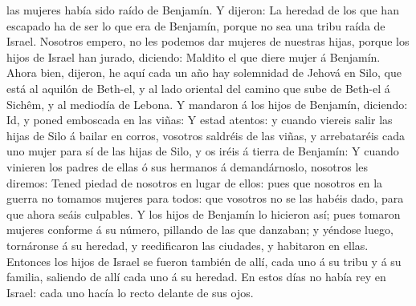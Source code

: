 las mujeres había sido raído de Benjamín.  Y dijeron: La
heredad de los que han escapado ha de ser lo que era de Benjamín, porque
no sea una tribu raída de Israel.  Nosotros empero, no les
podemos dar mujeres de nuestras hijas, porque los hijos de Israel han
jurado, diciendo: Maldito el que diere mujer á Benjamín. 
Ahora bien, dijeron, he aquí cada un año hay solemnidad de Jehová en
Silo, que está al aquilón de Beth-el, y al lado oriental del camino que
sube de Beth-el á Sichêm, y al mediodía de Lebona.  Y
mandaron á los hijos de Benjamín, diciendo: Id, y poned emboscada en las
viñas:  Y estad atentos: y cuando viereis salir las hijas
de Silo á bailar en corros, vosotros saldréis de las viñas, y
arrebataréis cada uno mujer para sí de las hijas de Silo, y os iréis á
tierra de Benjamín:  Y cuando vinieren los padres de ellas
ó sus hermanos á demandárnoslo, nosotros les diremos: Tened piedad de
nosotros en lugar de ellos: pues que nosotros en la guerra no tomamos
mujeres para todos: que vosotros no se las habéis dado, para que ahora
seáis culpables.  Y los hijos de Benjamín lo hicieron así;
pues tomaron mujeres conforme á su número, pillando de las que danzaban;
y yéndose luego, tornáronse á su heredad, y reedificaron las ciudades, y
habitaron en ellas.  Entonces los hijos de Israel se fueron
también de allí, cada uno á su tribu y á su familia, saliendo de allí
cada uno á su heredad.  En estos días no había rey en
Israel: cada uno hacía lo recto delante de sus ojos.
